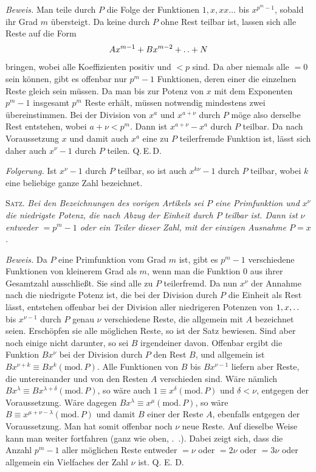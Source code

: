\emph{Beweis.} Man teile durch $P$ die Folge der Funktionen $1,x,xx\ldots$ bis $x^{p^m-1}$, sobald ihr Grad $m$ übersteigt. Da keine durch $P$ ohne Rest teilbar ist, lassen sich alle Reste auf die Form
\[
Ax^{m-1}+Bx^{m-2}+\mathinner{.\,.}+N
\]
bringen, wobei alle Koeffizienten positiv und $<p$ sind. Da aber niemals alle $=0$ sein können, gibt es offenbar nur $p^m-1$ Funktionen, deren einer die einzelnen Reste gleich sein müssen. Da man bis zur Potenz von $x$ mit dem Exponenten $p^m-1$ insgesamt $p^m$ Reste erhält, müssen notwendig mindestens zwei übereinstimmen. Bei der Division von $x^a$ und $x^{a+\nu}$ durch $P$ möge also derselbe Rest entstehen, wobei $a+\nu<p^m$. Dann ist $x^{a+\nu}-x^a$ durch $P$ teilbar. Da nach Voraussetzung $x$ und damit auch $x^a$ eine zu $P$ teilerfremde Funktion ist, lässt sich daher auch $x^\nu-1$ durch $P$ teilen. Q.\,E.\,D.

\emph{Folgerung.} Ist $x^\nu-1$ durch $P$ teilbar, so ist auch $x^{k\nu}-1$ durch $P$ teilbar, wobei $k$ eine beliebige ganze Zahl bezeichnet.

\textsc{Satz.} \emph{Bei den Bezeichnungen des vorigen Artikels sei $P$ eine Primfunktion und $x^\nu$ die niedrigste Potenz, die nach Abzug der Einheit durch $P$ teilbar ist. Dann ist $\nu$ entweder $=p^m-1$ oder ein Teiler dieser Zahl, mit der einzigen Ausnahme $P=x$.}

\emph{Beweis.} Da $P$ eine Primfunktion vom Grad $m$ ist, gibt es $p^m-1$ verschiedene Funktionen von kleinerem Grad als $m$, wenn man die Funktion $0$ aus ihrer Gesamtzahl ausschließt. Sie sind alle zu $P$ teilerfremd. Da nun $x^\nu$ der Annahme nach die niedrigste Potenz ist, die bei der Division durch $P$ die Einheit als Rest lässt, entstehen offenbar bei der Division aller niedrigeren Potenzen von $1,x,\mathinner{.\,.}$ bis $x^{\nu-1}$ durch $P$ genau $\nu$ verschiedene Reste, die allgemein mit $A$ bezeichnet seien. Erschöpfen sie alle möglichen Reste, so ist der Satz bewiesen. Sind aber noch einige nicht darunter, so sei $B$ irgendeiner davon. Offenbar ergibt die Funktion $Bx^\nu$ bei der Division durch $P$ den Rest $B$, und allgemein ist $Bx^{\nu+k}\equiv Bx^k(\mathrm{mod.}\,P)$. Alle Funktionen von $B$ bis $Bx^{\nu-1}$ liefern aber
Reste, die untereinander und von den Resten $A$ verschieden sind. Wäre nämlich $Bx^\lambda\equiv Bx^{\lambda+\delta}(\mathrm{mod.}\,P)$, so wäre auch $1\equiv x^\delta(\mathrm{mod.}\,P)$ und $\delta<\nu$, entgegen der Voraussetzung. Wäre dagegen $Bx^\lambda\equiv x^\mu(\mathrm{mod.}\,P)$, so wäre $B\equiv x^{\mu+\nu-\lambda}(\mathrm{mod.}\,P)$ und damit $B$ einer der Reste $A$, ebenfalls entgegen der Voraussetzung. Man hat somit offenbar noch $\nu$ neue Reste. Auf dieselbe Weise kann man weiter fortfahren (ganz wie oben, \textsection.\ .). Dabei zeigt sich, dass die Anzahl $p^m-1$ aller möglichen Reste entweder $=\nu$ oder $=2\nu$ oder $=3\nu$ oder allgemein ein Vielfaches der Zahl $\nu$ ist. Q. E. D.

